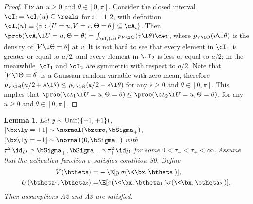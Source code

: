 \documentclass[11pt]{article}
\newtheorem{lemma}{Lemma}
\begin{document}
\begin{proof}
Fix an $u \ge 0$ and $\theta \in [0, \pi]$. Consider the closed interval $\cI_i = \cI_i(u) \subseteq \reals$ for $i = 1, 2$, with definition $\cI_i(u) \equiv \{v: \{U = u, V = v, \Theta = \theta \} \subseteq \cA_i \}$. Then $\prob(\cA_i \l U = u, \Theta = \theta) = \int_{\cI_i(u)} p_{V \l \Theta}(v \l \theta) \de v$, where $p_{V \l \Theta}(v \l \theta)$ is the density of $[V\l \Theta = \theta]$ at $v$. It is not hard to see that every element in $\cI_1$ is greater or equal to $a/2$, and every element in $\cI_2$ is less or equal to $a/2$; in the meanwhile, $\cI_1$ and $\cI_2$ are symmetric with respect to $a/2$. Note that $[V\l \Theta = \theta]$ is a Gaussian random variable with zero mean, therefore $p_{V\l \Theta}(a/2 + s \l\theta) \le p_{V\l \Theta}(a/2 - s \l\theta)$ for any $s \ge 0$ and $\theta \in [0, \pi]$. This implies that $\prob(\cA_1 \l U = u, \Theta = \theta) \le \prob(\cA_2 \l U = u, \Theta = \theta)$, for any $u \ge 0$ and $\theta \in [0, \pi]$. 
\end{proof}



\begin{lemma}\label{lem:CheckAssumptions}
Let $y \sim \textup{Unif}(\{-1, + 1\})$, $[\bx \l y = +1] \sim \normal(\bzero, \bSigma_+)$, $[\bx \l y = -1] \sim \normal(0,\bSigma_-)$ with 
$\tau_-^2 \id_D \preceq \bSigma_+, \bSigma_- \preceq
\tau_+^2 \id_D$ for some $0 < \tau_- < \tau_+ < \infty$. Assume that the activation function $\sigma$ satisfies condition {\sf S0}. Define 
\begin{equation}\label{eqn:Defintion_of_V_U_in_isotropic_proof}
\begin{aligned}
V(\btheta) =& -\E[y \, \sigma(\< \bx, \btheta\> )], \\
U(\btheta_1, \btheta_2) =& \E[\sigma(\< \bx, \btheta_1\>) \sigma(\< \bx, \btheta_2\>)]. \\
\end{aligned}
\end{equation}
Then assumptions {\sf A2} and {\sf A3} are satisfied. 
\end{lemma}
\end{document}
